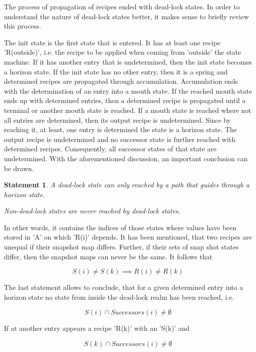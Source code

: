 \documentclass[12pt]{article}
\newtheorem{statement}{Statement}
\begin{document}
The process of propagation of recipes ended with dead-lock states. In order
to understand the nature of dead-lock states better, it makes sense to briefly
review this process. 

The init state is the first state that is entered. It has at least one recipe
'R(outside)', i.e. the recipe to be applied when coming from 'outside' the
state machine. If it has another entry that is undetermined, then the init
state becomes a horizon state. If the init state has no other entry, then it is
a spring and determined recipes are propagated through accumulation.
Accumulation ends with the determination of an entry into a mouth state. If the
reached mouth state ends up with determined entries, then a determined recipe
is propagated until a terminal or another mouth state is reached. If a mouth
state is reached where not all entries are determined, then its output recipe
is undetermined. Since by reaching it, at least, one entry is determined the
state is a horizon state. The output recipe is undetermined and no successor
state is further reached with determined recipes. Consequently, all successor
states of that state are undetermined.  With the aforementioned discussion, an
important conclusion can be drawn.

\begin{statement}
   A dead-lock state can only reached by a path that guides through a horizon
   state. 
   
   Non-dead-lock states are never reached by dead-lock states.
\end{statement}
   
In other words, it contains the indices of those states where values have been
stored in 'A' on which 'R(i)' depends. It has been mentioned, that two recipes
are unequal if their snapshot map differs. Further, if their sets of snap shot
states differ, then the snapshot maps can never be the same. It follows that

\[
                   S(i) \neq S(k) \implies R(i) \neq R(k)
\]

The last statement allows to conclude, that for a given determined entry into a
horizon state no state from inside the dead-lock realm has been reached, i.e.

\[
              S(i) \cap Successors(i) \neq \emptyset
\]

If at another entry appears a recipe 'R(k)' with an 'S(k)' and 

\[
              S(k) \cap Successors(i) \neq \emptyset
\]
\end{document}
